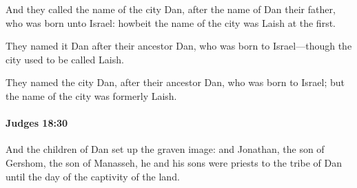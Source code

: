 			\begin{versebox}
					\item[BHS] 
					\item[ASV] And they called the name of the city Dan, after the name of Dan their father, who was born unto Israel: howbeit the name of the city was Laish at the first.
					\item[NIV] They named it Dan after their ancestor Dan, who was born to Israel—though the city used to be called Laish.
					\item[NRSV] They named the city Dan, after their ancestor Dan, who was born to Israel; but the name of the city was formerly Laish.
			\end{versebox}

		\paragraph{Judges 18:30} %
			\label{JUDGES-18-30}

			And the children of Dan set up the graven image: and Jonathan, the son of Gershom, the son of Manasseh, he and his sons were priests to the tribe of Dan until the day of the captivity of the land.

